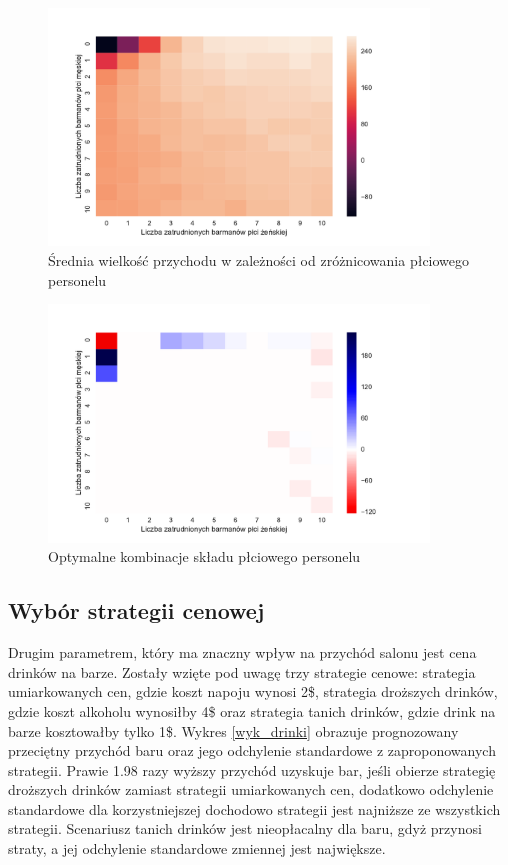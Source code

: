\documentclass[12pt, a4paper, oneside]{mwart} %
\begin{document}
\begin{figure}
\centering
\caption{Średnia wielkość przychodu w zależności od zróżnicowania płciowego personelu}
\label{wyk_barmani}
\includegraphics[width = 0.9\textwidth]{wykresy/barmani.pdf}
\end{figure}

\begin{figure}
\centering
\caption{Optymalne kombinacje składu płciowego personelu}
\label{wyk_opt_sciezka}
\includegraphics[width = 0.9\textwidth]{wykresy/opt_sciezka.pdf}
\end{figure}

\subsection{Wybór strategii cenowej}
Drugim parametrem, który ma znaczny wpływ na przychód salonu jest cena drinków na barze. Zostały wzięte pod uwagę trzy strategie cenowe: strategia umiarkowanych cen, gdzie koszt napoju wynosi 2\$, strategia droższych drinków, gdzie koszt alkoholu wynosiłby 4\$ oraz strategia tanich drinków, gdzie drink na barze kosztowałby tylko 1\$. Wykres \ref{wyk_drinki} obrazuje prognozowany przeciętny przychód baru oraz jego odchylenie standardowe z zaproponowanych strategii. Prawie 1.98 razy wyższy przychód uzyskuje bar, jeśli obierze strategię droższych drinków zamiast strategii umiarkowanych cen, dodatkowo odchylenie standardowe dla korzystniejszej dochodowo strategii jest najniższe ze wszystkich strategii. Scenariusz tanich drinków jest nieopłacalny dla baru, gdyż przynosi straty, a jej odchylenie standardowe zmiennej jest największe.
\end{document}
